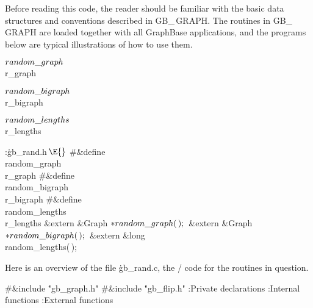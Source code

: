 Before reading this code, the reader should be familiar with the basic
data structures and conventions described in {\sc GB\_\,GRAPH}. The
routines in {\sc GB\_\,GRAPH} are loaded together with all GraphBase
applications, and the programs below are typical illustrations of how
to use them.

\Y\B\4\D$\\{random\_graph}$ \5
\\{r\_graph}\par
\B\4\D$\\{random\_bigraph}$ \5
\\{r\_bigraph}\par
\B\4\D$\\{random\_lengths}$ \5
\\{r\_lengths}\par
\Y\B\4:\.{gb\_rand.h\,}\X${}\E{}$\6
\8\#\&{define} \\{random\_graph}\5\\{r\_graph}\6
\8\#\&{define} \\{random\_bigraph}\5\\{r\_bigraph}\6
\8\#\&{define} \\{random\_lengths}\5\\{r\_lengths}\6
\&{extern} \&{Graph} ${}{*}\\{random\_graph}(\,);{}$\6
\&{extern} \&{Graph} ${}{*}\\{random\_bigraph}(\,);{}$\6
\&{extern} \&{long} \\{random\_lengths}(\,);\par
\fi

Here is an overview of the file \.{gb\_rand.c}, the \CEE/ code for the
routines in question.

\Y\B\8\#\&{include} \.{"gb\_graph.h"}\6
\8\#\&{include} \.{"gb\_flip.h"}\6
\ATH\7
:Private declarations\X\6
:Internal functions\X\6
:External functions\X\par
\fi


